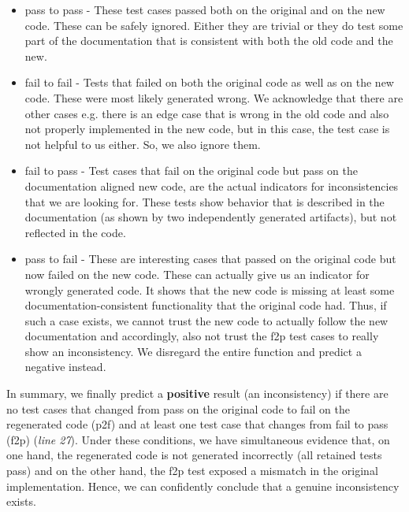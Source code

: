 \documentclass[acmsmall, screen]{acmart}
\begin{document}
\begin{itemize}
    \item[\textbf{p2p}] pass to pass - These test cases passed both on the original and on the new code. These can be safely ignored. Either they are trivial or they do test some part of the documentation that is consistent with both the old code and the new. 
    \item[\textbf{f2f}] fail to fail - Tests that failed on both the original code as well as on the new code. These were most likely generated wrong. We acknowledge that there are other cases e.g. there is an edge case that is wrong in the old code and also not properly implemented in the new code, but in this case, the test case is not helpful to us either. So, we also ignore them.%
    \item[\textbf{f2p}] fail to pass - Test cases that fail on the original code but pass on the documentation aligned new code, are the actual indicators for inconsistencies that we are looking for. These tests show behavior that is described in the documentation (as shown by two independently generated artifacts), but not reflected in the code.
    \item[\textbf{p2f}] pass to fail - These are interesting cases that passed on the original code but now failed on the new code. These can actually give us an indicator for wrongly generated code. It shows that the new code is missing at least some documentation-consistent functionality that the original code had. Thus, if such a case exists, we cannot trust the new code to actually follow the new documentation and accordingly, also not trust the f2p test cases to really show an inconsistency. We disregard the entire function and predict a negative instead. 
\end{itemize}

In summary, we finally predict a \textbf{positive} result (an inconsistency) if there are no test cases that changed from pass on the original code to fail on the regenerated code (p2f) and at least one test case that changes from fail to pass (f2p) (\textit{line 27}). Under these conditions, we have simultaneous evidence that, on one hand, the regenerated code is not generated incorrectly (all retained tests pass) and on the other hand, the f2p test exposed a mismatch in the original implementation. Hence, we can confidently conclude that a genuine inconsistency exists.
\end{document}
